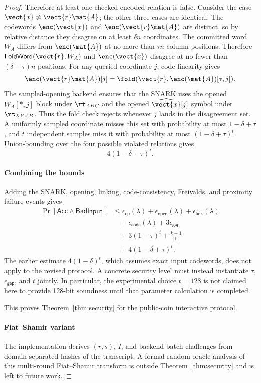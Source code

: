 \begin{proof}
Therefore at least one checked encoded relation is false.  Consider the case
\(\vect{x}\neq\vect{r}\mat{A}\); the other three cases are identical.  The
codewords \(\enc(\vect{x})\) and \(\enc(\vect{r}\mat{A})\) are distinct, so by
relative distance they disagree on at least \(\delta n\) coordinates.  The
committed word \(W_A\) differs from \(\enc(\mat{A})\) at no more than
\(\tau n\) column positions.  Therefore
\(\mathsf{FoldWord}(\vect{r},W_A)\) and \(\enc(\vect{x})\) disagree at no
fewer than \((\delta-\tau)n\) positions.  For any queried coordinate \(j\),
code linearity gives
\[
  \enc(\vect{r}\mat{A})[j]
  =
  \fold(\vect{r},\enc(\mat{A})[*,j]).
\]
The sampled-opening backend ensures that the SNARK uses the opened
\(W_A[*,j]\) block under \(\rt_{ABC}\) and the opened
\(\widehat{\vect{x}}[j]\) symbol under \(\rt_{XYZB}\).  Thus the fold check
rejects whenever \(j\) lands in the disagreement set.  A uniformly sampled
coordinate misses this set with probability at most \(1-\delta+\tau\), and
\(t\) independent samples miss it with probability at most
\((1-\delta+\tau)^t\).
Union-bounding over the four possible violated relations gives
\[
  4(1-\delta+\tau)^t .
\]

\paragraph{Combining the bounds}
Adding the SNARK, opening, linking, code-consistency, Freivalds, and proximity
failure events gives
\[
\begin{aligned}
\Pr[\mathsf{Acc}\land\mathsf{BadInput}]
&\le
\epsilon_{\mathsf{cp}}(\lambda)
+\epsilon_{\mathsf{open}}(\lambda)
+\epsilon_{\mathsf{link}}(\lambda)\\
&\quad+\epsilon_{\mathsf{code}}(\lambda)
+3\epsilon_{\mathsf{gap}}\\
&\quad+3(1-\tau)^t
+\frac{k-1}{|\mathbb{F}|}\\
&\quad+4(1-\delta+\tau)^t .
\end{aligned}
\]
The earlier estimate \(4(1-\delta)^t\), which assumes exact input codewords,
does not apply to the revised protocol.  A concrete security level must instead
instantiate \(\tau\), \(\epsilon_{\mathsf{gap}}\), and \(t\) jointly.  In
particular, the experimental choice \(t=128\) is not claimed here to provide
128-bit soundness until that parameter calculation is completed.

This proves Theorem~\ref{thm:security} for the public-coin interactive protocol.

\paragraph{Fiat--Shamir variant}
The implementation derives \((r,s)\), \(I\), and backend batch challenges from
domain-separated hashes of the transcript. A formal random-oracle analysis of
this multi-round Fiat--Shamir transform is outside Theorem~\ref{thm:security}
and is left to future work.
\end{proof}

